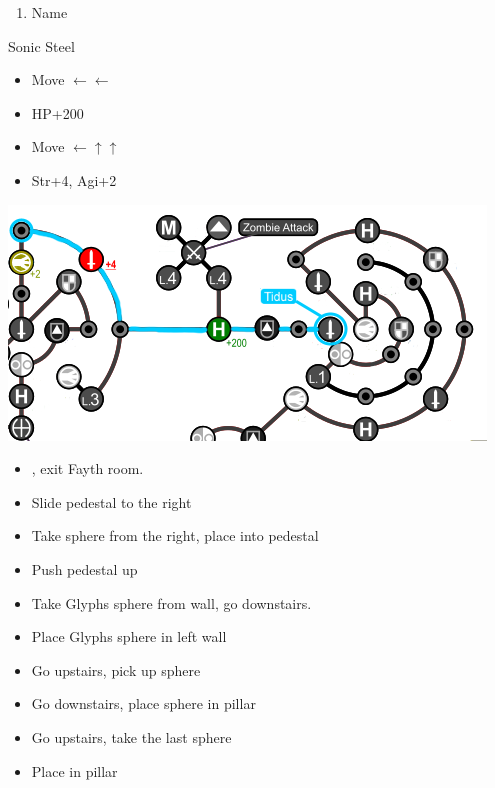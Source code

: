 \begin{enumerate}[resume]
  \item Name \shiva
\end{enumerate}
\begin{equip}
\begin{itemize}
\tidusf Sonic Steel
\end{itemize}
\end{equip}
\vfill
\begin{spheregrid}
  \begin{itemize}
    \tidusf
    \begin{itemize}
      \item Move $\leftarrow\leftarrow$
      \item HP+200
      \item Move $\leftarrow\uparrow\uparrow$
      \item Str+4, Agi+2
    \end{itemize}
    \includegraphics[width=.8\columnwidth]{graphics/Tidus_Post_Seymour}
  \end{itemize}
\end{spheregrid}
\begin{trial}
  \begin{itemize}
    \item \save, exit Fayth room.
    \item Slide pedestal to the right
    \item Take sphere from the right, place into pedestal
    \item Push pedestal up
    \item Take Glyphs sphere from wall, go downstairs.
    \item Place Glyphs sphere in left wall
    \item Go upstairs, pick up sphere
    \item Go downstairs, place sphere in pillar
    \item Go upstairs, take the last sphere
    \item Place in pillar
  \end{itemize}
\end{trial}

